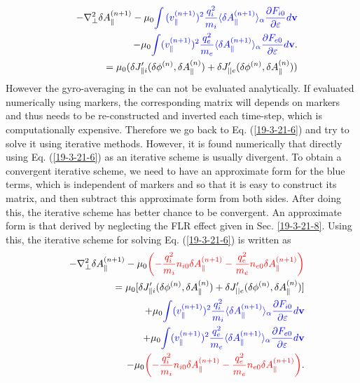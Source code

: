 \documentclass{llncs}
\newcommand{\tmcolor}[2]{{\color{#1}{#2}}}
\begin{document}
\begin{eqnarray}
  &  & - \nabla^2_{\perp} \delta A_{\parallel}^{(n + 1)} - \mu_0
  \tmcolor{blue}{\int {(v_{\parallel}^{(n + 1)})^2}  \frac{q^2_i}{m_i} \langle
  \delta A_{\parallel}^{(n + 1)} \rangle_{\alpha} \frac{\partial F_{i
  0}}{\partial \varepsilon} d\mathbf{v}} \nonumber\\
  &  & - \mu_0 \tmcolor{blue}{\int (v_{\parallel}^{(n + 1)})^2
  \frac{q^2_e}{m_e} \langle \delta A_{\parallel}^{(n + 1)} \rangle_{\alpha}
  \frac{\partial F_{e 0}}{\partial \varepsilon} d\mathbf{v}} . \nonumber\\
  &  & = \mu_0  (\delta J_{\parallel i}' (\delta \phi^{(n)}, \delta
  A_{\parallel}^{(n)}) + \delta J'_{||e} (\delta \phi^{(n)}, \delta
  A_{\parallel}^{(n)})) 
\end{eqnarray}
However the gyro-averaging in the \tmcolor{blue}{blue terms} can not be
evaluated analytically. If evaluated numerically using markers, the
corresponding matrix will depends on markers and thus needs to be
re-constructed and inverted each time-step, which is computationally
expensive. Therefore we go back to Eq. (\ref{19-3-21-6}) and try to solve it
using iterative methods. However, it is found numerically that directly using
Eq. (\ref{19-3-21-6}) as an iterative scheme is usually divergent. To obtain a
convergent iterative scheme, we need to have an approximate form for the blue
terms, which is independent of markers and so that it is easy to construct its
matrix, and then subtract this approximate form from both sides. After doing
this, the iterative scheme has better chance to be convergent. An approximate
form is that derived by neglecting the FLR effect given in Sec.
\ref{19-3-21-8}. Using this, the iterative scheme for solving Eq.
(\ref{19-3-21-6}) is written as
\begin{eqnarray}
  &  & - \nabla^2_{\perp} \delta A_{\parallel}^{(n + 1)} - \mu_0
  \tmcolor{red}{\left( - \frac{q^2_i}{m_i} n_{i 0} \delta A_{\parallel}^{(n +
  1)} - \frac{q^2_e}{m_e} n_{e 0} \delta A_{\parallel}^{(n + 1)} \right)}
  \nonumber\\
  &  & = \mu_0 [\delta J_{\parallel i}' (\delta \phi^{(n)}, \delta
  A_{\parallel}^{(n)}) + \delta J'_{||e} (\delta \phi^{(n)}, \delta
  A_{\parallel}^{(n)})] \nonumber\\
  &  & + \mu_0 \tmcolor{blue}{\int (v_{\parallel}^{(n + 1)})^2
  \frac{q^2_i}{m_i} \langle \delta A_{\parallel}^{(n + 1)} \rangle_{\alpha}
  \frac{\partial F_{i 0}}{\partial \varepsilon} d\mathbf{v}} \nonumber\\
  &  & + \mu_0 \tmcolor{blue}{\int (v_{\parallel}^{(n + 1)})^2
  \frac{q^2_e}{m_e} \langle \delta A_{\parallel}^{(n + 1)} \rangle_{\alpha}
  \frac{\partial F_{e 0}}{\partial \varepsilon} d\mathbf{v}} \nonumber\\
  &  & - \mu_0 \tmcolor{red}{\left( - \frac{q^2_i}{m_i} n_{i 0} \delta
  A_{\parallel}^{(n + 1)} - \frac{q^2_e}{m_e} n_{e 0} \delta A_{\parallel}^{(n
  + 1)} \right)} .  \label{19-3-21-p1}
\end{eqnarray}
\end{document}
